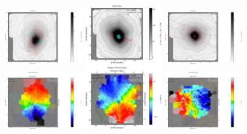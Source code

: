 \begin{figure}
      \centering
      \includegraphics[width=0.3\textwidth]{chapter4/Vmaps/ngc3100_stellar_img.png}
      \includegraphics[width=0.3\textwidth]{chapter4/Vmaps/ngc3557_stellar_img.png}
      \includegraphics[width=0.3\textwidth]{chapter4/Vmaps/ngc7075_stellar_img.png}
      \\
      \includegraphics[width=0.3\textwidth]{chapter4/Vmaps/ngc3100_stellar_vel.png}
      \includegraphics[width=0.3\textwidth]{chapter4/Vmaps/ngc3557_stellar_vel.png}
      \includegraphics[width=0.3\textwidth]{chapter4/Vmaps/ngc7075_stellar_vel.png}

\end{figure}
